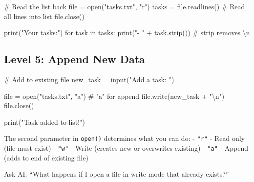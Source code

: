\documentclass[
  letterpaper,
  DIV=11,
  numbers=noendperiod,
  oneside]{scrreprt}
\newenvironment{Shaded}{}{}
\newcommand{\BuiltInTok}[1]{\textcolor[rgb]{0.84,0.23,0.29}{#1}}
\newcommand{\CharTok}[1]{\textcolor[rgb]{0.01,0.18,0.38}{#1}}
\newcommand{\CommentTok}[1]{\textcolor[rgb]{0.42,0.45,0.49}{#1}}
\newcommand{\ControlFlowTok}[1]{\textcolor[rgb]{0.84,0.23,0.29}{#1}}
\newcommand{\KeywordTok}[1]{\textcolor[rgb]{0.84,0.23,0.29}{#1}}
\newcommand{\NormalTok}[1]{\textcolor[rgb]{0.14,0.16,0.18}{#1}}
\newcommand{\OperatorTok}[1]{\textcolor[rgb]{0.14,0.16,0.18}{#1}}
\newcommand{\StringTok}[1]{\textcolor[rgb]{0.01,0.18,0.38}{#1}}
\begin{document}
\begin{Shaded}
\begin{Highlighting}[]
\CommentTok{\# Read the list back}
\BuiltInTok{file} \OperatorTok{=} \BuiltInTok{open}\NormalTok{(}\StringTok{"tasks.txt"}\NormalTok{, }\StringTok{"r"}\NormalTok{)}
\NormalTok{tasks }\OperatorTok{=} \BuiltInTok{file}\NormalTok{.readlines()  }\CommentTok{\# Read all lines into list}
\BuiltInTok{file}\NormalTok{.close()}

\BuiltInTok{print}\NormalTok{(}\StringTok{"Your tasks:"}\NormalTok{)}
\ControlFlowTok{for}\NormalTok{ task }\KeywordTok{in}\NormalTok{ tasks:}
    \BuiltInTok{print}\NormalTok{(}\StringTok{"{-} "} \OperatorTok{+}\NormalTok{ task.strip())  }\CommentTok{\# strip removes \textbackslash{}n}
\end{Highlighting}
\end{Shaded}

\subsection{Level 5: Append New Data}\label{level-5-append-new-data}

\begin{Shaded}
\begin{Highlighting}[]
\CommentTok{\# Add to existing file}
\NormalTok{new\_task }\OperatorTok{=} \BuiltInTok{input}\NormalTok{(}\StringTok{"Add a task: "}\NormalTok{)}

\BuiltInTok{file} \OperatorTok{=} \BuiltInTok{open}\NormalTok{(}\StringTok{"tasks.txt"}\NormalTok{, }\StringTok{"a"}\NormalTok{)  }\CommentTok{\# "a" for append}
\BuiltInTok{file}\NormalTok{.write(new\_task }\OperatorTok{+} \StringTok{"}\CharTok{\textbackslash{}n}\StringTok{"}\NormalTok{)}
\BuiltInTok{file}\NormalTok{.close()}

\BuiltInTok{print}\NormalTok{(}\StringTok{"Task added to list!"}\NormalTok{)}
\end{Highlighting}
\end{Shaded}

\begin{tcolorbox}[enhanced jigsaw, opacityback=0, colback=white, colframe=quarto-callout-note-color-frame, breakable, titlerule=0mm, coltitle=black, rightrule=.15mm, colbacktitle=quarto-callout-note-color!10!white, left=2mm, bottomtitle=1mm, bottomrule=.15mm, title=\textcolor{quarto-callout-note-color}{\faInfo}\hspace{0.5em}{Expression Explorer: File Modes}, opacitybacktitle=0.6, toptitle=1mm, leftrule=.75mm, arc=.35mm, toprule=.15mm]

The second parameter in \texttt{open()} determines what you can do: -
\texttt{"r"} - Read only (file must exist) - \texttt{"w"} - Write
(creates new or overwrites existing) - \texttt{"a"} - Append (adds to
end of existing file)

Ask AI: ``What happens if I open a file in write mode that already
exists?''

\end{tcolorbox}
\end{document}
